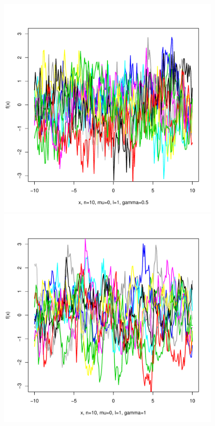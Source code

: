 \documentclass[12pt,letterpaper]{article}
\begin{document}
\begin{figure}
\begin{center}
\includegraphics[scale=0.2]{hw321/n10-m0-l1-g1.pdf}
\includegraphics[scale=0.2]{hw321/n10-m0-l1-g2.pdf}

\end{center}
\end{figure}
\end{document}
